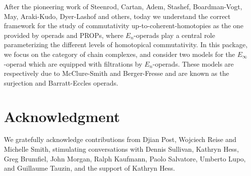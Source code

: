 \documentclass{amsart}
\begin{document}
After the pioneering work of Steenrod, Cartan, Adem, Stashef, Boardman-Vogt, May, Araki-Kudo, Dyer-Lashof and others, today we understand the correct framework for the study of commutativity up-to-coherent-homotopies as the one provided by operads and PROPs, where $E_n$-operads play a central role parameterizing the different levels of homotopical commutativity. In this package, we focus on the category of chain complexes, and consider two models for the $E_\infty$-operad which are equipped with filtrations by $E_n$-operads. These models are respectively due to McClure-Smith and Berger-Fresse and are known as the surjection and Barratt-Eccles operads.


\section*{Acknowledgment}
We gratefully acknowledge contributions from Djian Post, Wojciech Reise and Michelle Smith, stimulating conversations with Dennis Sullivan, Kathryn Hess, Greg Brumfiel, John Morgan, Ralph Kaufmann, Paolo Salvatore, Umberto Lupo, and Guillaume Tauzin, and the support of Kathryn Hess.
\end{document}
